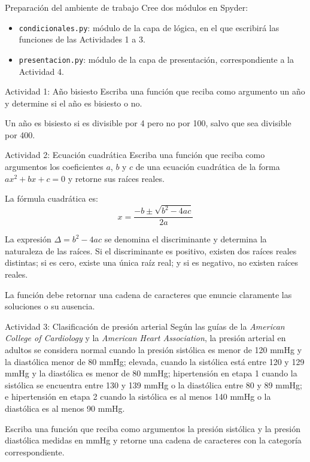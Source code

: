 \documentclass{ip-lab}
\begin{document}
\maketitle

\begin{sectionbox}{Preparación del ambiente de trabajo}
  Cree dos módulos en Spyder:
  \begin{itemize}
    \item \texttt{condicionales.py}: módulo de la capa de lógica, en el que escribirá las funciones de las Actividades 1 a 3.
    \item \texttt{presentacion.py}: módulo de la capa de presentación, correspondiente a la Actividad 4.
  \end{itemize}
\end{sectionbox}


\begin{sectionbox}{Actividad 1: Año bisiesto}
  Escriba una función que reciba como argumento un año y determine si el año es bisiesto o no.

  Un año es bisiesto si es divisible por 4 pero no por 100, salvo que sea divisible por 400.
\end{sectionbox}


\begin{sectionbox}{Actividad 2: Ecuación cuadrática}
  Escriba una función que reciba como argumentos los coeficientes $a$, $b$ y $c$ de una ecuación cuadrática de la forma $ax^2 + bx + c = 0$ y retorne sus raíces reales.

  La fórmula cuadrática es:
  \[
    x = \frac{-b \pm \sqrt{b^2 - 4ac}}{2a}
  \]

  La expresión $\Delta = b^2 - 4ac$ se denomina el discriminante y determina la naturaleza de las raíces. Si el discriminante es positivo, existen dos raíces reales distintas; si es cero, existe una única raíz real; y si es negativo, no existen raíces reales.

  La función debe retornar una cadena de caracteres que enuncie claramente las soluciones o su ausencia.
\end{sectionbox}

\pagebreak

\begin{sectionbox}{Actividad 3: Clasificación de presión arterial}
  Según las guías de la \textit{American College of Cardiology} y la \textit{American Heart Association}, la presión arterial en adultos se considera normal cuando la presión sistólica es menor de 120 mmHg y la diastólica menor de 80 mmHg; elevada, cuando la sistólica está entre 120 y 129 mmHg y la diastólica es menor de 80 mmHg; hipertensión en etapa 1 cuando la sistólica se encuentra entre 130 y 139 mmHg o la diastólica entre 80 y 89 mmHg; e hipertensión en etapa 2 cuando la sistólica es al menos 140 mmHg o la diastólica es al menos 90 mmHg.

  Escriba una función que reciba como argumentos la presión sistólica y la presión diastólica medidas en mmHg y retorne una cadena de caracteres con la categoría correspondiente.
\end{sectionbox}
\end{document}

